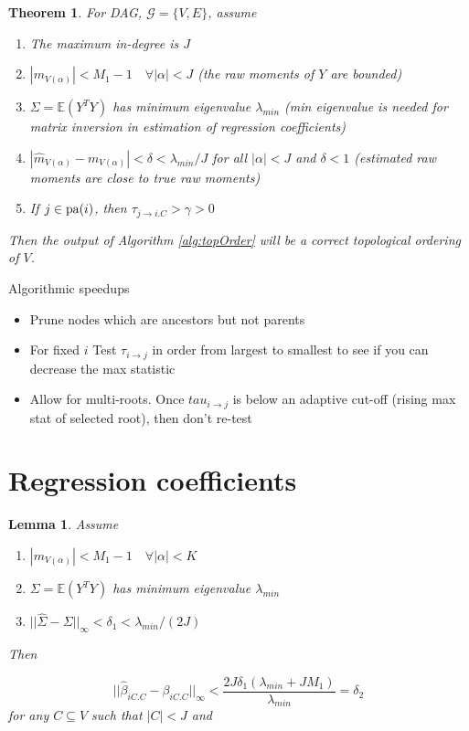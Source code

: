 \documentclass[]{article}
\newtheorem{theorem}{Theorem}
\newtheorem{lemma}{Lemma}
\newcommand{\E}{\mathbb{E}}
\newcommand{\pa}{{\rm pa}}       %
\begin{document}
\begin{theorem}
For DAG, $\mathcal{G} = \{V,E\}$, assume
\begin{enumerate}
\item The maximum in-degree is $J$
\item $|m_{V(\alpha)}| < M_1 - 1 \quad \forall |\alpha| < J$ (the raw moments of $Y$ are bounded)
\item $\Sigma = \E(Y^T Y)$ has minimum eigenvalue $\lambda_{min}$ (min eigenvalue is needed for matrix inversion in estimation of regression coefficients)
\item $|\hat m_{V(\alpha)} - m_{V(\alpha)}| < \delta < \lambda_{min}/J$ for all $|\alpha| < J$ and $\delta < 1$ (estimated raw moments are close to true raw moments)
\item If $j \in \pa(i)$, then $\tau_{j\rightarrow i.C} > \gamma > 0$ 
\end{enumerate}

Then the output of Algorithm \ref{alg:topOrder} will be a correct topological ordering of $V$. 
\end{theorem}

Algorithmic speedups
\begin{itemize}
\item Prune nodes which are ancestors but not parents
\item For fixed $i$ Test $\tau_{i \rightarrow j}$ in order from largest to smallest to see if you can decrease the max statistic
\item Allow for multi-roots. Once $tau_{i\rightarrow j}$ is below an adaptive cut-off (rising max stat of selected root), then don't re-test
\end{itemize}

\section{Regression coefficients}

\begin{lemma}
Assume

\begin{enumerate}
\item $|m_{V(\alpha)}| < M_1 - 1 \quad \forall |\alpha| < K$
\item  $\Sigma = \E(Y^T Y)$ has minimum eigenvalue $\lambda_{min}$
\item $||\hat \Sigma  - \Sigma ||_\infty < \delta_1 < \lambda_{min}/(2J)$
\end{enumerate}

Then

\[|| \hat \beta_{iC.C} - \beta_{iC.C} ||_\infty < \frac{2J \delta_1 \left( \lambda_{min} + J M_1\right)}{\lambda_{min}} = \delta_2\]
for any $C \subseteq V$ such that $|C| < J$ and 
\end{lemma}
\end{document}
